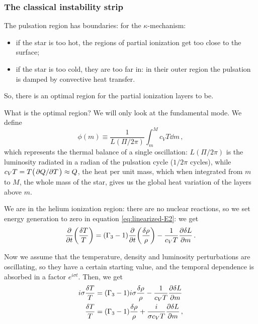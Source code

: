 \documentclass[main.tex]{subfiles}
\begin{document}
\subsubsection{The classical instability strip}

The pulsation region has boundaries:
for the \(\kappa \)-mechanism:
\begin{itemize}
    \item if the star is too hot, the regions of partial ionization get too close to the surface;
    \item if the star is too cold, they are too far in: in their outer region the pulsation is damped by convective heat transfer.
\end{itemize}

So, there is an optimal region for the partial ionization layers to be.

What is the optimal region? We will only look  at the fundamental mode. We define
%
\begin{equation}
  \phi (m) \equiv \frac{1}{L(\Pi / 2 \pi )}\int_m^M c_V T \dd{m} 
\,,
\end{equation}
%
which represents the thermal balance of a single oscillation: \(L(\Pi / 2 \pi )\) is the luminosity radiated in a radian of the pulsation cycle (\(1/ 2 \pi \) cycles), 
while \(c_V T = T \qty(\pdv*{Q}{T}) \approx Q\), the heat per unit mass, which when integrated from \(m\) to \(M\), the whole mass of the star, gives us the global heat variation of the layers above \(m\). 

We are in the helium ionization region: there are no nuclear reactions, so we set energy generation to zero in equation \eqref{eq:linearized-E2}: we get 
%
\begin{align}
\pdv{}{t} \qty(\frac{ \delta T}{T}) =
(\Gamma_3 -1) \pdv{}{t} \qty(\frac{ \delta \rho }{\rho })
- \frac{1}{c_V T} \pdv{ \delta L}{m}
\,.
\end{align}

Now we assume that the temperature, density and luminosity perturbations are oscillating, so they have a certain starting value, and the temporal dependence is absorbed in a factor \(e^{i \sigma t}\). Then, we get 
%
\begin{align}
i \sigma \frac{ \delta T}{T} &= (\Gamma_3 -1) i \sigma \frac{ \delta \rho }{\rho } - \frac{1}{c_V T} \pdv{ \delta L}{m} \\
\frac{ \delta T}{T} &= (\Gamma_3 -1) \frac{ \delta \rho }{\rho } + \frac{i}{\sigma  c_V T} \pdv{ \delta L}{m} 
\,,
\end{align}
%
\end{document}
